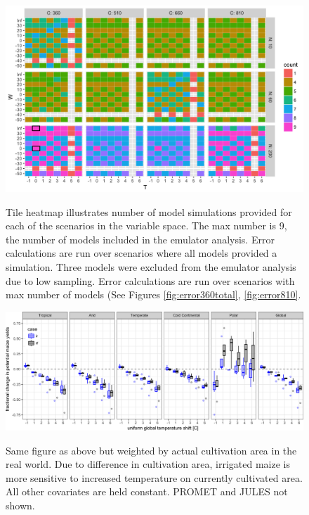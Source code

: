 \documentclass[10pt]{article}
\begin{document}
\begin{figure}[h!]
\includegraphics[width=\textwidth]{s_how_many_simulations.png}\\
\caption{Tile heatmap illustrates number of model simulations provided for each of the scenarios in the variable space. The max number is 9, the number of models included in the emulator analysis. Error calculations are run over scenarios where all models provided a simulation. Three models were excluded from the emulator analysis due to low sampling. Error calculations are run over scenarios with max number of models (See Figures \ref{fig:error360total}, \ref{fig:error810}.}
\label{fig:numbersims}
\end{figure}

\begin{figure}[h!]
\includegraphics[width=\textwidth]{s_maize_sim_CG_area_weight.png}\\
\caption{Same figure as above but weighted by actual cultivation area in the real world. Due to difference in cultivation area, irrigated maize is more sensitive to increased temperature on currently cultivated area. All other covariates are held constant. PROMET and JULES not shown.}
\label{fig:KGirr_currentcult}
\end{figure}
\end{document}
